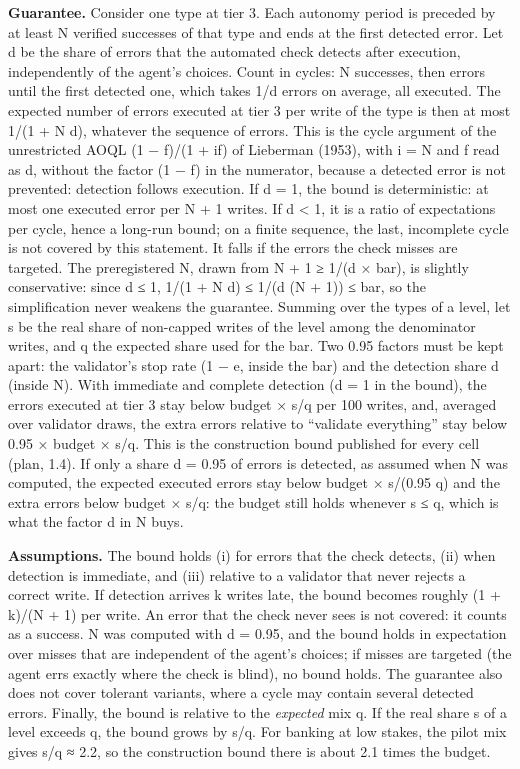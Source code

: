 \textbf{Guarantee.} Consider one type at tier 3. Each autonomy period is preceded by at least N verified successes of that type and ends at the first detected error. Let d be the share of errors that the automated check detects after execution, independently of the agent's choices. Count in cycles: N successes, then errors until the first detected one, which takes 1/d errors on average, all executed. The expected number of errors executed at tier 3 per write of the type is then at most 1/(1 + N d), whatever the sequence of errors. This is the cycle argument of the unrestricted AOQL (1 − f)/(1 + if) of Lieberman (1953), with i = N and f read as d, without the factor (1 − f) in the numerator, because a detected error is not prevented: detection follows execution. If d = 1, the bound is deterministic: at most one executed error per N + 1 writes. If d \textless{} 1, it is a ratio of expectations per cycle, hence a long-run bound; on a finite sequence, the last, incomplete cycle is not covered by this statement. It falls if the errors the check misses are targeted. The preregistered N, drawn from N + 1 ≥ 1/(d × bar), is slightly conservative: since d ≤ 1, 1/(1 + N d) ≤ 1/(d (N + 1)) ≤ bar, so the simplification never weakens the guarantee. Summing over the types of a level, let s be the real share of non-capped writes of the level among the denominator writes, and q the expected share used for the bar. Two 0.95 factors must be kept apart: the validator's stop rate (1 − e, inside the bar) and the detection share d (inside N). With immediate and complete detection (d = 1 in the bound), the errors executed at tier 3 stay below budget × s/q per 100 writes, and, averaged over validator draws, the extra errors relative to ``validate everything'' stay below 0.95 × budget × s/q. This is the construction bound published for every cell (plan, 1.4). If only a share d = 0.95 of errors is detected, as assumed when N was computed, the expected executed errors stay below budget × s/(0.95 q) and the extra errors below budget × s/q: the budget still holds whenever s ≤ q, which is what the factor d in N buys.

\textbf{Assumptions.} The bound holds (i) for errors that the check detects, (ii) when detection is immediate, and (iii) relative to a validator that never rejects a correct write. If detection arrives k writes late, the bound becomes roughly (1 + k)/(N + 1) per write. An error that the check never sees is not covered: it counts as a success. N was computed with d = 0.95, and the bound holds in expectation over misses that are independent of the agent's choices; if misses are targeted (the agent errs exactly where the check is blind), no bound holds. The guarantee also does not cover tolerant variants, where a cycle may contain several detected errors. Finally, the bound is relative to the \emph{expected} mix q. If the real share s of a level exceeds q, the bound grows by s/q. For banking at low stakes, the pilot mix gives s/q ≈ 2.2, so the construction bound there is about 2.1 times the budget.

